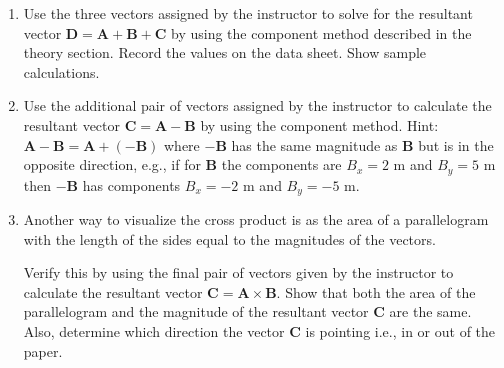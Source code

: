 \documentclass[main.tex]{subfiles}
\begin{document}
\begin{enumerate}
\item
Use the three vectors assigned by the instructor to solve for the resultant vector $\mathbf{D}=\mathbf{A}+\mathbf{B}+\mathbf{C}$ by using the component method described in the theory section. Record the values on the data sheet. Show sample calculations.
\item
Use the additional pair of vectors assigned by the instructor to calculate the resultant vector $\mathbf{C}=\mathbf{A}-\mathbf{B}$ by using the component method. Hint: $\mathbf{A}-\mathbf{B}=\mathbf{A}+ (-\mathbf{B})$ where $-\mathbf{B}$ has the same magnitude as $\mathbf{B}$ but is in the opposite direction, e.g., if for $\mathbf{B}$ the components are $B_x=2\text{ m}$ and $B_y=5\text{ m}$ then $-\mathbf{B}$ has components $B_x=-2\text{ m}$ and $B_y=-5\text{ m}.$
\item
Another way to visualize the cross product is as the area of a parallelogram with the length of the sides equal to the magnitudes of the vectors.
\begin{figure}[h]
\centering
{}
\caption{}
\end{figure}
Verify this by using the final pair of vectors given by the instructor to calculate the resultant vector $\mathbf{C}=\mathbf{A}\times\mathbf{B}.$ Show that both the area of the parallelogram and the magnitude of the resultant vector $\mathbf{C}$ are the same. Also, determine which direction the vector $\mathbf{C}$ is pointing i.e., in or out of the paper.
\end{enumerate}
\FloatBarrier
\end{document}
